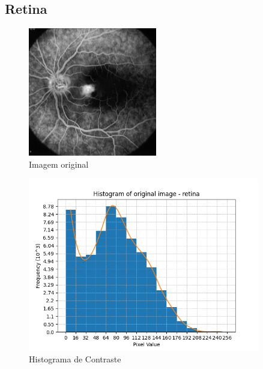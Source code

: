 \documentclass[12pt, letterpaper]{article}
\begin{document}
    \subsection{Retina}
        \begin{figure}[H]
            \label{hist:retina}
            \centering
            \includegraphics[width=0.5\textwidth]{retina.png}
            \\{Imagem original}

            \includegraphics[width=0.9\textwidth]{retina_histogram.png}
            \\{Histograma de Contraste}
        \end{figure}
\end{document}
